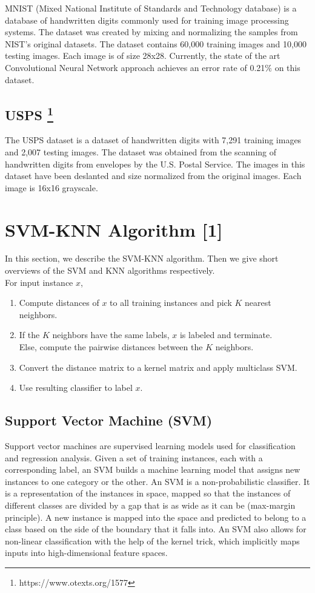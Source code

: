 \documentclass[11pt,letterpaper]{article}
\begin{document}
MNIST (Mixed National Institute of Standards and Technology database) is a database of handwritten digits commonly used for training image processing systems. The dataset was created by mixing and normalizing the samples from NIST's original datasets. The dataset contains 60,000 training images and 10,000 testing images. Each image is of size 28x28. Currently, the state of the art Convolutional Neural Network approach achieves an error rate of 0.21$\%$ on this dataset.

\subsection{USPS \footnote{https://www.otexts.org/1577}}

The USPS dataset is a dataset of handwritten digits with 7,291 training images and 2,007 testing images. The dataset was obtained from the scanning of handwritten digits from envelopes by the U.S. Postal Service. The images in this dataset have been deslanted and size normalized from the original images. Each image is 16x16 grayscale.

\section{SVM-KNN Algorithm [1]}

In this section, we describe the SVM-KNN algorithm. Then we give short overviews of the SVM and KNN algorithms respectively.\\

For input instance $x$,
\begin{enumerate}[(1)]
\item Compute distances of $x$ to all training instances and pick $K$ nearest neighbors.
\item If the $K$ neighbors have the same labels, $x$ is labeled and terminate.\\
\qquad Else, compute the pairwise distances between the $K$ neighbors.
\item Convert the distance matrix to a kernel matrix and apply multiclass SVM.
\item Use resulting classifier to label $x$.
\end{enumerate}

\subsection{Support Vector Machine (SVM)}

Support vector machines are supervised learning models used for classification and regression analysis. Given a set of training instances, each with a corresponding label, an SVM builds a machine learning model that assigns new instances to one category or the other. An SVM is a non-probabilistic classifier. It is a representation of the instances in space, mapped so that the instances of different classes are divided by a gap that is as wide as it can be (max-margin principle). A new instance is mapped into the space and predicted to belong to a class based on the side of the boundary that it falls into. An SVM also allows for non-linear classification with the help of the kernel trick, which implicitly maps inputs into high-dimensional feature spaces. 
\end{document}
